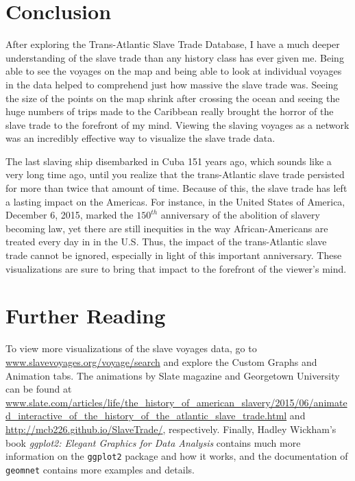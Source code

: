 \documentclass[DIV=calc, paper=a4, fontsize=10pt, twocolumn]{scrartcl}\usepackage[]{graphicx}\usepackage[]{color}
\begin{document}
\section*{Conclusion}

After exploring the Trans-Atlantic Slave Trade Database, I have a much deeper understanding of the slave trade than any history class has ever given me. Being able to see the voyages on the map and being able to look at individual voyages in the data helped to comprehend just how massive the slave trade was. Seeing the size of the points on the map shrink after crossing the ocean and seeing the huge numbers of trips made to the Caribbean really brought the horror of the slave trade to the forefront of my mind. Viewing the slaving voyages as a network was an incredibly effective way to visualize the slave trade data. 

\par The last slaving ship disembarked in Cuba 151 years ago, which sounds like a very long time ago, until you realize that the trans-Atlantic slave trade persisted for more than twice that amount of time.  Because of this, the slave trade has left a lasting impact on the Americas. For instance, in the United States of America, December 6, 2015, marked the $150^{th}$ anniversary of the abolition of slavery becoming law, yet there are still inequities in the way African-Americans are treated every day in in the U.S. Thus, the impact of the trans-Atlantic slave trade cannot be ignored, especially in light of this important anniversary. These visualizations are sure to bring that impact to the forefront of the viewer's mind. 
%
%
\section*{Further Reading}
To view more visualizations of the slave voyages data, go to \url{www.slavevoyages.org/voyage/search} and explore the Custom Graphs and Animation tabs. The animations by Slate magazine and Georgetown University can be found at \url{www.slate.com/articles/life/the_history_of_american_slavery/2015/06/animated_interactive_of_the_history_of_the_atlantic_slave_trade.html} and \url{http://mcb226.github.io/SlaveTrade/}, respectively. Finally, Hadley Wickham’s book \emph{ggplot2: Elegant Graphics for Data Analysis} contains much more information on the \texttt{ggplot2} package and how it works, and the documentation of \texttt{geomnet} contains more examples and details.

\end{document}
